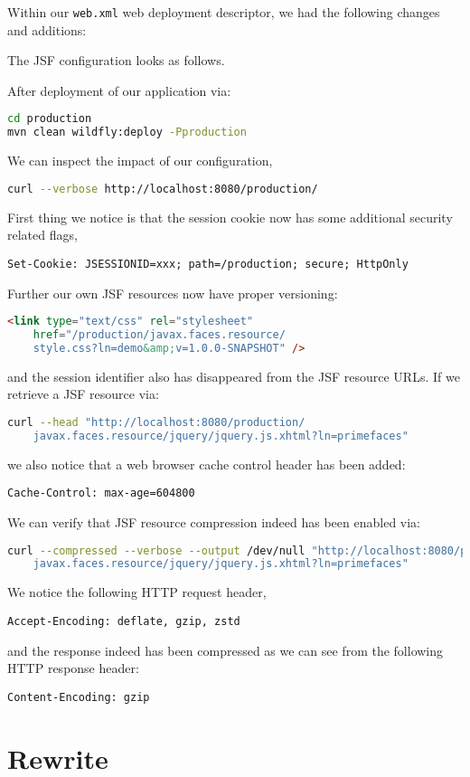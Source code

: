 Within our \texttt{web.xml} web deployment descriptor, we had the following changes and additions:

The JSF configuration looks as follows.

After deployment of our application via:
\begin{lstlisting}[language=bash]
cd production
mvn clean wildfly:deploy -Pproduction
\end{lstlisting}
We can inspect the impact of our configuration,
\begin{lstlisting}[language=bash]
curl --verbose http://localhost:8080/production/
\end{lstlisting}
First thing we notice is that the session cookie now has some additional security related flags,
\begin{lstlisting}
Set-Cookie: JSESSIONID=xxx; path=/production; secure; HttpOnly
\end{lstlisting}
Further our own JSF resources now have proper versioning:
\begin{lstlisting}[language=html]
<link type="text/css" rel="stylesheet"
	href="/production/javax.faces.resource/
	style.css?ln=demo&amp;v=1.0.0-SNAPSHOT" />
\end{lstlisting}
and the session identifier also has disappeared from the JSF resource URLs.
If we retrieve a JSF resource via:
\begin{lstlisting}[language=bash]
curl --head "http://localhost:8080/production/
	javax.faces.resource/jquery/jquery.js.xhtml?ln=primefaces"
\end{lstlisting}
we also notice that a web browser cache control header has been added:
\begin{lstlisting}
Cache-Control: max-age=604800
\end{lstlisting}
We can verify that JSF resource compression indeed has been enabled via:
\begin{lstlisting}[language=bash]
curl --compressed --verbose --output /dev/null "http://localhost:8080/production/
	javax.faces.resource/jquery/jquery.js.xhtml?ln=primefaces"
\end{lstlisting}
We notice the following HTTP request header,
\begin{lstlisting}
Accept-Encoding: deflate, gzip, zstd
\end{lstlisting}
and the response indeed has been compressed as we can see from the following HTTP response header:
\begin{lstlisting}
Content-Encoding: gzip
\end{lstlisting}

\section{Rewrite}


